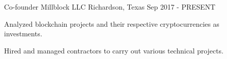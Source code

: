 \begin{cventries}
	\cventry
	{Co-founder} %
	{Millblock LLC} %
	{Richardson, Texas} %
	{Sep 2017 - PRESENT} %
	{
		\begin{cvitems} %
			\item {Analyzed blockchain projects and their respective cryptocurrencies as investments.}
			\item {Hired and managed contractors to carry out various technical projects.}
		\end{cvitems}
	}


\end{cventries}
